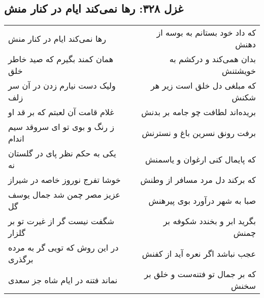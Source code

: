 \begin{center}
\section*{غزل ۳۲۸: رها نمی‌کند ایام در کنار منش}
\label{sec:328}
\begin{longtable}{l p{0.5cm} r}
رها نمی‌کند ایام در کنار منش
&&
که داد خود بستانم به بوسه از دهنش
\\
همان کمند بگیرم که صید خاطر خلق
&&
بدان همی‌کند و درکشم به خویشتنش
\\
ولیک دست نیارم زدن در آن سر زلف
&&
که مبلغی دل خلق است زیر هر شکنش
\\
غلام قامت آن لعبتم که بر قد او
&&
بریده‌اند لطافت چو جامه بر بدنش
\\
ز رنگ و بوی تو ای سروقد سیم اندام
&&
برفت رونق نسرین باغ و نسترنش
\\
یکی به حکم نظر پای در گلستان نه
&&
که پایمال کنی ارغوان و یاسمنش
\\
خوشا تفرج نوروز خاصه در شیراز
&&
که برکند دل مرد مسافر از وطنش
\\
عزیز مصر چمن شد جمال یوسف گل
&&
صبا به شهر درآورد بوی پیرهنش
\\
شگفت نیست گر از غیرت تو بر گلزار
&&
بگرید ابر و بخندد شکوفه بر چمنش
\\
در این روش که تویی گر به مرده برگذری
&&
عجب نباشد اگر نعره آید از کفنش
\\
نماند فتنه در ایام شاه جز سعدی
&&
که بر جمال تو فتنه‌ست و خلق بر سخنش
\\
\end{longtable}
\end{center}
